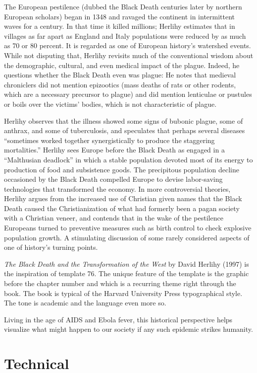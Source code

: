 The European pestilence (dubbed the Black Death centuries later by northern European scholars) began in 1348 and ravaged the continent in intermittent waves for a century. In that time it killed millions; Herlihy estimates that in villages as far apart as England and Italy populations were reduced by as much as 70 or 80 percent. It is regarded as one of European history's watershed events. While not disputing that, Herlihy revisits much of the conventional wisdom about the demographic, cultural, and even medical impact of the plague. Indeed, he questions whether the Black Death even was plague: He notes that medieval chroniclers did not mention epizootics (mass deaths of rats or other rodents, which are a necessary precursor to plague) and did mention lenticulae or pustules or boils over the victims' bodies, which is not characteristic of plague. 

Herlihy observes that the illness showed some signs of bubonic plague, some of anthrax, and some of tuberculosis, and speculates that perhaps several diseases ``sometimes worked together synergistically to produce the staggering mortalities.'' Herlihy sees Europe before the Black Death as engaged in a ``Malthusian deadlock'' in which a stable population devoted most of its energy to production of food and subsistence goods. The precipitous population decline occasioned by the Black Death compelled Europe to devise labor-saving technologies that transformed the economy. In more controversial theories, Herlihy argues from the increased use of Christian given names that the Black Death caused the Christianization of what had formerly been a pagan society with a Christian veneer, and contends that in the wake of the pestilence Europeans turned to preventive measures such as birth control to check explosive population growth. A stimulating discussion of some rarely considered aspects of one of history's turning points.

\emph{The Black Death and the Transformation of the West} by David Herlihy (1997) is the inspiration of template 76. The unique feature of the template is the graphic before the chapter number and which is a recurring theme right through the book. The book is typical of the Harvard University Press typographical style. The tone is academic and the language even more so. 

Living in the age of AIDS and Ebola fever, this historical perspective helps visualize what might happen to our society if any such epidemic strikes humanity.

\section{Technical}

